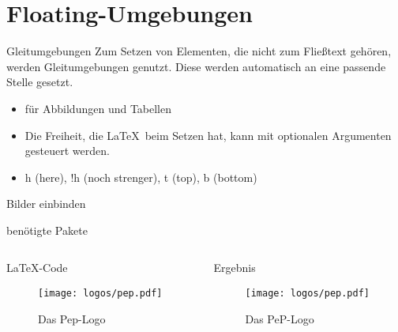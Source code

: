 \section{Floating-Umgebungen}

\begin{frame}{Gleitumgebungen}
  Zum Setzen von Elementen, die nicht zum Fließtext gehören, werden Gleitumgebungen genutzt.
  Diese werden automatisch an eine passende Stelle gesetzt.
  \begin{itemize}
    \item für Abbildungen und Tabellen
    \item Die Freiheit, die \LaTeX \ beim Setzen hat, kann mit optionalen Argumenten gesteuert werden.
    \item h (here), !h (noch strenger), t (top), b (bottom)
  \end{itemize}
\end{frame}

\begin{frame}[fragile]{Bilder einbinden}
  \begin{block}{benötigte Pakete}
    \begin{lstverbatim}
    \usepackage{graphicx}
    \usepackage{grffile}
    \usepackage[labelfont=bf]{caption}
    \end{lstverbatim}
  \end{block}
  \begin{columns}[T]
    \begin{column}{0.6\textwidth}
      \begin{block}{\LaTeX-Code}
        \begin{lstverbatim}
        \begin{figure}
          \centering
          \texttt{[image: logos/pep.pdf]}
          \caption{Das Pep-Logo}
          \label{fig:peplogo}
        \end{figure}
        \end{lstverbatim}
      \end{block}
    \end{column}
    \begin{column}{0.35\textwidth}
      \begin{block}{Ergebnis}
        \begin{figure}
          \centering
          \texttt{[image: logos/pep.pdf]}
          \caption{Das PeP-Logo}
          \label{fig:peplogo}
        \end{figure}
      \end{block}
    \end{column}
  \end{columns}
\end{frame}
